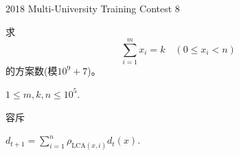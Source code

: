 \documentclass[11pt,serif]{beamer}
\begin{document}
	\begin{frame}{2018 Multi-University Training Contest 8}
		
		\begin{problem}
			求
			$$
				\sum_{i = 1}^{m}x_i = k \quad (0 \leq x_i < n)
			$$
			的方案数(模$10^9+7$)。
			
			$1 \leq m, k, n \leq 10^5$.
		\end{problem}
	
		\pause
		
		\begin{solution}
			容斥
		\end{solution}
	
	\end{frame} 

	\begin{frame}
		$d_{t+1} = \sum_{i=1}^n \rho_{\mathrm{LCA}(x, i)} d_t(x) $.
	\end{frame}
\end{document}
